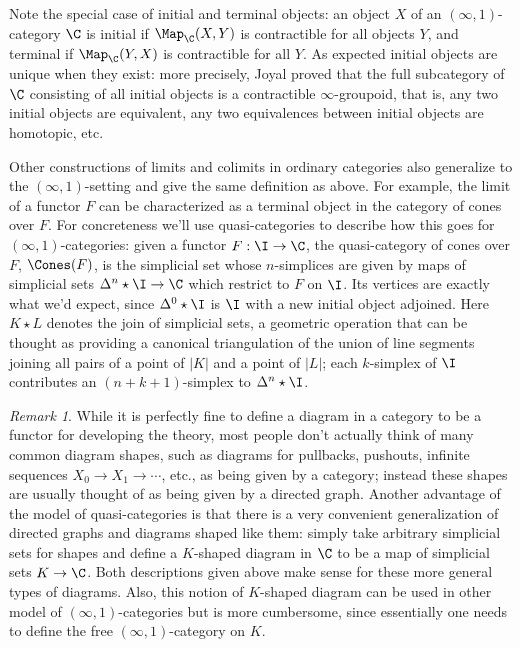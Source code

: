 \documentclass[12pt]{amsart}
\theoremstyle{definition} \newtheorem{definition}[theorem]{Definition}
\theoremstyle{remark} \newtheorem{remark}[theorem]{Remark}
\numberwithin{equation}{section}
\newcommand{\oo}{\infty}
\newcommand{\io}{$(\oo,1)$}
\newcommand{\abs}[1]{\left|#1\right|}
\begin{document}
Note the special case of initial and terminal objects: an object $X$ of
an \io-category $\C$ is initial if $\Map_\C(X,Y)$ is contractible for all
objects $Y$, and terminal if $\Map_\C(Y,X)$ is contractible for all
$Y$. As expected initial objects are unique when they exist: more
precisely, Joyal proved that the full subcategory of $\C$ consisting
of all initial objects is a contractible $\oo$-groupoid, that is, any
two initial objects are equivalent, any two equivalences between
initial objects are homotopic, etc.

Other constructions of limits and colimits in ordinary categories also
generalize to the \io-setting and give the same definition as above.
For example, the limit of a functor $F$ can be characterized as a
terminal object in the category of cones over $F$. For concreteness
we'll use quasi-categories to describe how this goes for
\io-categories: given a functor $F : \I \to \C$, the quasi-category of
cones over $F$, $\Cones(F)$, is the simplicial set whose $n$-simplices
are given by maps of simplicial sets $\Delta^n \star \I \to \C$ which
restrict to $F$ on $\I$. Its vertices are exactly what we'd expect,
since $\Delta^0 \star \I$ is $\I$ with a new initial object adjoined.
Here $K \star L$ denotes the join of simplicial sets, a geometric
operation that can be thought as providing a canonical triangulation
of the union of line segments joining all pairs of a point of $\abs{K}$
and a point of $\abs{L}$; each $k$-simplex of $\I$ contributes an
$(n+k+1)$-simplex to $\Delta^n \star \I$.

\begin{remark}
  While it is perfectly fine to define a diagram in a category to be a
  functor for developing the theory, most people don't actually think
  of many common diagram shapes, such as diagrams for pullbacks,
  pushouts, infinite sequences $X_0 \to X_1 \to \cdots$, etc., as
  being given by a category; instead these shapes are usually thought
  of as being given by a directed graph. Another advantage of the
  model of quasi-categories is that there is a very convenient
  generalization of directed graphs and diagrams shaped like them:
  simply take arbitrary simplicial sets for shapes and define a
  $K$-shaped diagram in $\C$ to be a map of simplicial sets $K \to
  \C$. Both descriptions given above make sense for these more general
  types of diagrams. Also, this notion of $K$-shaped diagram can be
  used in other model of \io-categories but is more cumbersome, since
  essentially one needs to define the free \io-category on $K$.
\end{remark}
\end{document}
